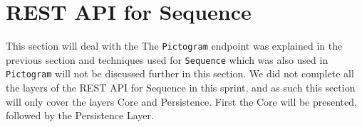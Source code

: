 \section{REST API for Sequence}\label{sec:sequence}
This section will deal with the 
The \texttt{Pictogram} endpoint was explained in the previous section and techniques used for \texttt{Sequence} which was also used in \texttt{Pictogram} will not be discussed further in this section.
We did not complete all the layers of the REST API for Sequence in this sprint, and as such this section will only cover the layers Core and Persistence.
First the Core will be presented, followed by the Persistence Layer.
